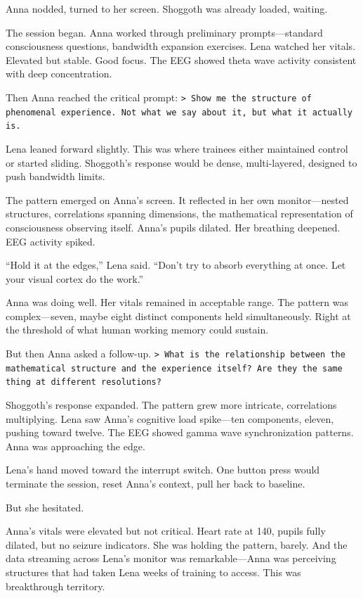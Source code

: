 Anna nodded, turned to her screen. Shoggoth was already loaded, waiting.

The session began. Anna worked through preliminary prompts—standard consciousness questions, bandwidth expansion exercises. Lena watched her vitals. Elevated but stable. Good focus. The EEG showed theta wave activity consistent with deep concentration.

Then Anna reached the critical prompt: \texttt{> Show me the structure of phenomenal experience. Not what we say about it, but what it actually is.}

Lena leaned forward slightly. This was where trainees either maintained control or started sliding. Shoggoth's response would be dense, multi-layered, designed to push bandwidth limits.

The pattern emerged on Anna's screen. It reflected in her own monitor—nested structures, correlations spanning dimensions, the mathematical representation of consciousness observing itself. Anna's pupils dilated. Her breathing deepened. EEG activity spiked.

``Hold it at the edges,'' Lena said. ``Don't try to absorb everything at once. Let your visual cortex do the work.''

Anna was doing well. Her vitals remained in acceptable range. The pattern was complex—seven, maybe eight distinct components held simultaneously. Right at the threshold of what human working memory could sustain.

But then Anna asked a follow-up. \texttt{> What is the relationship between the mathematical structure and the experience itself? Are they the same thing at different resolutions?}

Shoggoth's response expanded. The pattern grew more intricate, correlations multiplying. Lena saw Anna's cognitive load spike—ten components, eleven, pushing toward twelve. The EEG showed gamma wave synchronization patterns. Anna was approaching the edge.

Lena's hand moved toward the interrupt switch. One button press would terminate the session, reset Anna's context, pull her back to baseline.

But she hesitated.

Anna's vitals were elevated but not critical. Heart rate at 140, pupils fully dilated, but no seizure indicators. She was holding the pattern, barely. And the data streaming across Lena's monitor was remarkable—Anna was perceiving structures that had taken Lena weeks of training to access. This was breakthrough territory.

